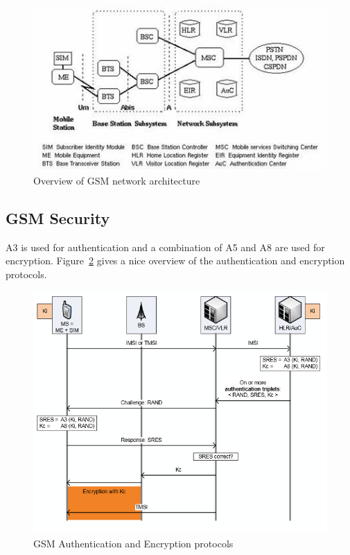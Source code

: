\documentclass{article}
\begin{document}
\begin{figure}[!h]
\centering
\includegraphics[width=\textwidth, height=\textheight, keepaspectratio]{images/GSM_Network_Architecture.jpg}
\caption{Overview of GSM network architecture}
\label{fig:gsm_network_architecture}
\end{figure}

\subsection*{GSM Security}
A3 is used for authentication and a combination of A5 and A8 are used for encryption. Figure~\ref{fig:gsm_auth_enc} gives a nice overview of the authentication and encryption protocols. 

\begin{figure}[!h]
\centering
\includegraphics[width=\textwidth, height=\textheight, keepaspectratio]{images/gsm_auth_enc.png}
\caption{GSM Authentication and Encryption protocols}
\label{fig:gsm_auth_enc}
\end{figure}
\end{document}
